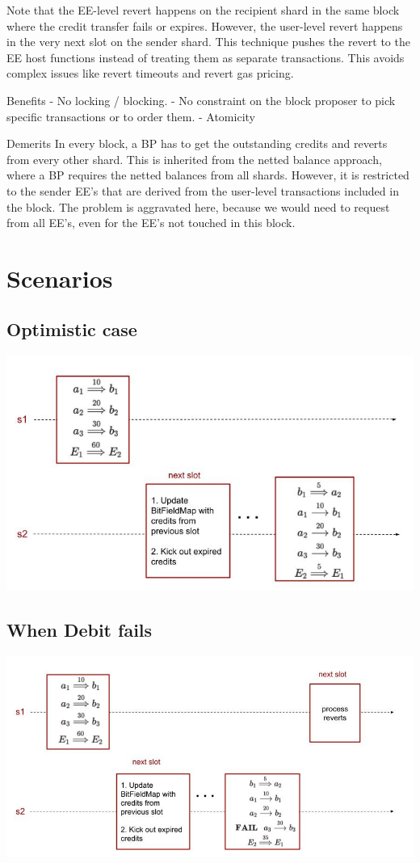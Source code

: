 \documentclass{article}
\begin{document}
Note that the EE-level revert happens on the recipient shard in the same block where the credit transfer fails or expires. However, the user-level revert happens in the very next slot on the sender shard. This technique pushes the revert to the EE host functions instead of treating them as separate transactions. This avoids complex issues like revert timeouts and revert gas pricing.

Benefits
- No locking / blocking.
- No constraint on the block proposer to pick specific transactions or to order them.
- Atomicity

Demerits
In every block, a BP has to get the outstanding credits and reverts from every other shard. This is inherited from the netted balance approach, where a BP requires the netted balances from all shards. However, it is restricted to the sender EE's that are derived from the user-level transactions included in the block. The problem is aggravated here, because we would need to request from all EE's, even for the EE's not touched in this block.

\section{Scenarios}
\subsection{Optimistic case}
\includegraphics[scale=0.5]{OptmisiticCase.jpg}
\subsection{When Debit fails}
\includegraphics[scale=0.5]{Credit-2.jpg}
\end{document}
